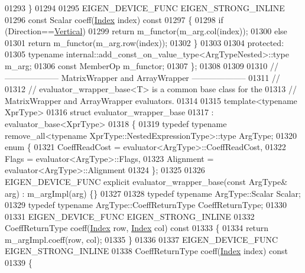 \begin{DoxyCode}
01293   \}
01294 
01295   EIGEN\_DEVICE\_FUNC EIGEN\_STRONG\_INLINE
01296   \textcolor{keyword}{const} Scalar coeff(\hyperlink{namespace_eigen_a62e77e0933482dafde8fe197d9a2cfde}{Index} index)\textcolor{keyword}{ const}
01297 \textcolor{keyword}{  }\{
01298     \textcolor{keywordflow}{if} (Direction==\hyperlink{group__enums_ggad49a7b3738e273eb00932271b36127f7addca718e0564723df21d61b94b1198be}{Vertical})
01299       \textcolor{keywordflow}{return} m\_functor(m\_arg.col(index));
01300     \textcolor{keywordflow}{else}
01301       \textcolor{keywordflow}{return} m\_functor(m\_arg.row(index));
01302   \}
01303 
01304 \textcolor{keyword}{protected}:
01305   \textcolor{keyword}{typename} internal::add\_const\_on\_value\_type<ArgTypeNested>::type m\_arg;
01306   \textcolor{keyword}{const} MemberOp m\_functor;
01307 \};
01308 
01309 
01310 \textcolor{comment}{// -------------------- MatrixWrapper and ArrayWrapper --------------------}
01311 \textcolor{comment}{//}
01312 \textcolor{comment}{// evaluator\_wrapper\_base<T> is a common base class for the}
01313 \textcolor{comment}{// MatrixWrapper and ArrayWrapper evaluators.}
01314 
01315 \textcolor{keyword}{template}<\textcolor{keyword}{typename} XprType>
01316 \textcolor{keyword}{struct }evaluator\_wrapper\_base
01317   : evaluator\_base<XprType>
01318 \{
01319   \textcolor{keyword}{typedef} \textcolor{keyword}{typename} remove\_all<typename XprType::NestedExpressionType>::type ArgType;
01320   \textcolor{keyword}{enum} \{
01321     CoeffReadCost = evaluator<ArgType>::CoeffReadCost,
01322     Flags = evaluator<ArgType>::Flags,
01323     Alignment = evaluator<ArgType>::Alignment
01324   \};
01325 
01326   EIGEN\_DEVICE\_FUNC \textcolor{keyword}{explicit} evaluator\_wrapper\_base(\textcolor{keyword}{const} ArgType& arg) : m\_argImpl(arg) \{\}
01327 
01328   \textcolor{keyword}{typedef} \textcolor{keyword}{typename} ArgType::Scalar Scalar;
01329   \textcolor{keyword}{typedef} \textcolor{keyword}{typename} ArgType::CoeffReturnType CoeffReturnType;
01330 
01331   EIGEN\_DEVICE\_FUNC EIGEN\_STRONG\_INLINE
01332   CoeffReturnType coeff(\hyperlink{namespace_eigen_a62e77e0933482dafde8fe197d9a2cfde}{Index} row, \hyperlink{namespace_eigen_a62e77e0933482dafde8fe197d9a2cfde}{Index} col)\textcolor{keyword}{ const}
01333 \textcolor{keyword}{  }\{
01334     \textcolor{keywordflow}{return} m\_argImpl.coeff(row, col);
01335   \}
01336 
01337   EIGEN\_DEVICE\_FUNC EIGEN\_STRONG\_INLINE
01338   CoeffReturnType coeff(\hyperlink{namespace_eigen_a62e77e0933482dafde8fe197d9a2cfde}{Index} index)\textcolor{keyword}{ const}
01339 \textcolor{keyword}{  }\{

\end{DoxyCode}
